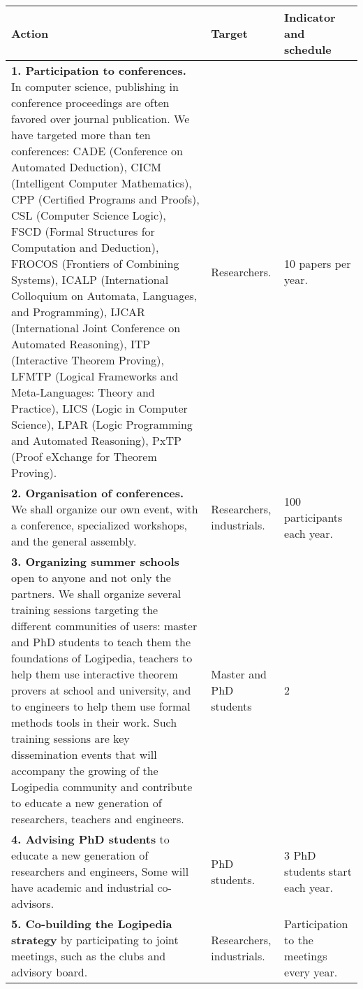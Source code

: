 \begin{longtable}{|p{}|p{}|p{}|}
\hline
{\bf Action}
&
{\bf Target}
&
{\bf Indicator and schedule}
\\
\hline
{\bf 1. Participation to conferences.}
In computer science, publishing in conference
proceedings are often favored over journal publication. We have targeted
more than ten conferences:
CADE (Conference on Automated Deduction),
CICM (Intelligent Computer Mathematics),
CPP (Certified Programs and Proofs),
CSL (Computer Science Logic),
FSCD (Formal Structures for Computation and Deduction),
FROCOS (Frontiers of Combining Systems),
ICALP (International Colloquium on Automata, Languages, and Programming),
IJCAR (International Joint Conference on Automated Reasoning),
ITP (Interactive Theorem Proving),
LFMTP (Logical Frameworks and Meta-Languages: Theory
and Practice), 
LICS (Logic in Computer Science),
LPAR (Logic Programming and Automated Reasoning),
PxTP (Proof eXchange for Theorem Proving).
&
Researchers.
&
10 papers per year.
\\
\hline
{\bf 2. Organisation of conferences.}
We shall organize our own event, with a conference,
specialized workshops, and the general assembly.
&
Researchers, industrials.
&
100 participants each year.
\\
\hline
{\bf 3. Organizing summer schools}
open to anyone and not only the partners.
We shall organize several training sessions targeting the
different communities of users: master and PhD students to teach them
the foundations of Logipedia, teachers to help them use interactive
theorem provers at school and university, and to engineers to help
them use formal methods tools in their work. Such training sessions
are key dissemination events that will accompany the growing of the
Logipedia community and contribute to educate a new generation of researchers,
teachers and engineers.
&
Master and PhD students
&
2
\\
\hline
    {\bf 4.
Advising PhD students} 
to educate a new generation of researchers and engineers, 
Some will have academic and industrial co-advisors.
&
PhD students.
&
3 PhD students start each year.
\\
\hline
{\bf 5. Co-building the Logipedia strategy}
by participating to joint meetings, such as
the clubs and advisory board.
&
Researchers, industrials.
&
Participation to the meetings
every year.
\\

\end{longtable}
